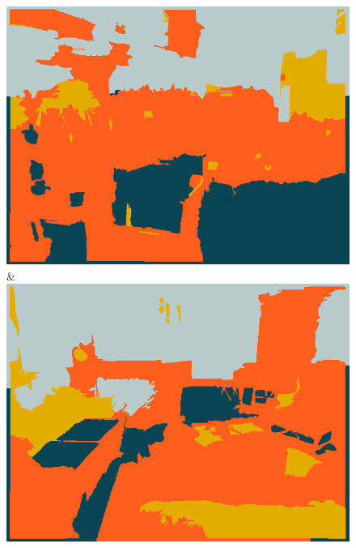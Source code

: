 \documentclass[a4paper, 10pt, conference]{ieeeconf}      %
\begin{document}
\begin{figure}
\begin{tabu}
    \includegraphics[width=\linewidth]{images/00118_ssvm.png}&%
    \includegraphics[width=\linewidth]{images/01203_ssvm.png}\\
    \vspace{3mm}\\


\end{tabu}
\end{figure}
\end{document}
